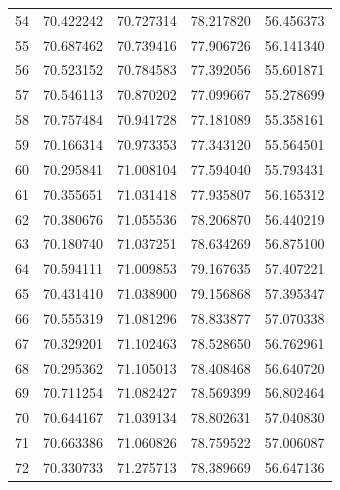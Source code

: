 \begin{table}
\begin{tabular}{rrrrr}
54 & 70.422242 & 70.727314 & 78.217820 & 56.456373 \\
55 & 70.687462 & 70.739416 & 77.906726 & 56.141340 \\
56 & 70.523152 & 70.784583 & 77.392056 & 55.601871 \\
57 & 70.546113 & 70.870202 & 77.099667 & 55.278699 \\
58 & 70.757484 & 70.941728 & 77.181089 & 55.358161 \\
59 & 70.166314 & 70.973353 & 77.343120 & 55.564501 \\
60 & 70.295841 & 71.008104 & 77.594040 & 55.793431 \\
61 & 70.355651 & 71.031418 & 77.935807 & 56.165312 \\
62 & 70.380676 & 71.055536 & 78.206870 & 56.440219 \\
63 & 70.180740 & 71.037251 & 78.634269 & 56.875100 \\
64 & 70.594111 & 71.009853 & 79.167635 & 57.407221 \\
65 & 70.431410 & 71.038900 & 79.156868 & 57.395347 \\
66 & 70.555319 & 71.081296 & 78.833877 & 57.070338 \\
67 & 70.329201 & 71.102463 & 78.528650 & 56.762961 \\
68 & 70.295362 & 71.105013 & 78.408468 & 56.640720 \\
69 & 70.711254 & 71.082427 & 78.569399 & 56.802464 \\
70 & 70.644167 & 71.039134 & 78.802631 & 57.040830 \\
71 & 70.663386 & 71.060826 & 78.759522 & 57.006087 \\
72 & 70.330733 & 71.275713 & 78.389669 & 56.647136 \\
\bottomrule
\end{tabular}
\end{table}
